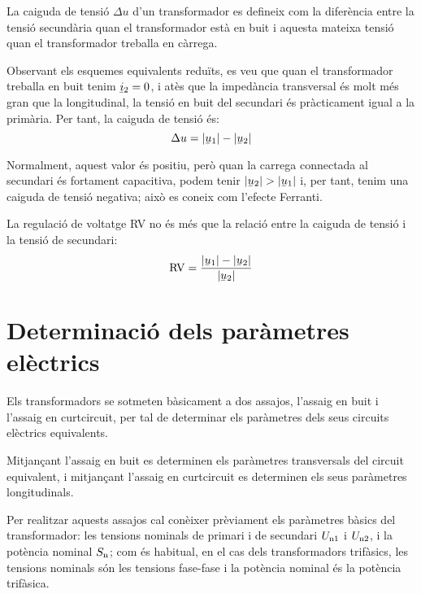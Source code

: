 La caiguda de tensió $\Delta u$ d'un transformador  es defineix com la diferència entre la tensió secundària quan el transformador està en buit i aquesta mateixa tensió quan el transformador treballa en càrrega.

Observant els esquemes equivalents reduïts, es veu que quan el transformador treballa en buit tenim $\cmplx{i}_2=0$, i atès que la impedància transversal és molt més gran que la longitudinal, la tensió en buit del secundari és pràcticament igual a la primària. Per tant, la caiguda de tensió és:
\begin{equation}
    \Delta u = |\cmplx{u}_1| - |\cmplx{u}_2|
\end{equation}

Normalment, aquest valor és positiu, però quan la carrega connectada al secundari és fortament capacitiva, podem tenir  $|\cmplx{u}_2| > |\cmplx{u}_1|$ i, per tant, tenim una caiguda de tensió negativa; això es coneix com l'efecte Ferranti.

La regulació de voltatge RV no és més que la relació entre la caiguda de tensió i la tensió de secundari:
\begin{equation}
    \text{RV} = \frac{|\cmplx{u}_1| - |\cmplx{u}_2|}{|\cmplx{u}_2|}
\end{equation}

\section{Determinació dels paràmetres elèctrics}\label{sec:determ-param-trafo}

Els transformadors se sotmeten bàsicament a dos assajos, l'assaig en
buit i l'assaig en curtcircuit, per tal de determinar els paràmetres
dels seus circuits elèctrics equivalents.

Mitjançant l'assaig en buit es determinen els paràmetres
transversals del circuit equivalent, i mitjançant l'assaig en curtcircuit es determinen els seus paràmetres longitudinals.

Per  realitzar aquests assajos cal conèixer prèviament els paràmetres
bàsics del transformador: les tensions nominals de primari i de
secundari $U_\mathrm{n1}$ i $U_\mathrm{n2}$, i la potència nominal
$S_\mathrm{n}$; com és habitual, en el cas dels transformadors
trifàsics, les tensions nominals són les tensions fase-fase i la
potència nominal és la potència trifàsica.

